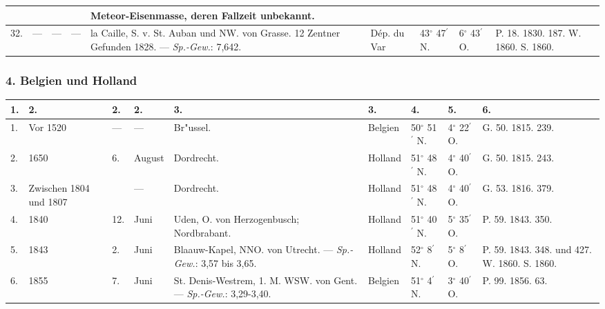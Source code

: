 \documentclass[a4paper, 8pt, oneside, polutonikogreek, german]{article}
\begin{document}
\begin{center}
\begin{longtable}{|p{3mm}|p{10mm}|p{5mm}|p{12mm}|p{25mm}|p{17mm}|p{11mm}|p{11mm}|p{11mm}|}
         & & & & Meteor-Eisenmasse, deren Fallzeit unbekannt. & & & & \\ \hline
        32. & --- & --- & --- & la Caille, S. v. St. Auban und NW. von Grasse. 12 Zentner Gefunden 1828. --- \emph{Sp.-Gew.}: 7,642. & Dép. du Var & 43$^\circ$ 47$^\prime$ N. & 6$^\circ$ 43$^\prime$ O. & P. 18. 1830. 187. W. 1860. S. 1860. \\ \hline
    \end{longtable}
\end{center}
\subsubsection{4. Belgien und Holland}
\begin{table}[H]
    \centering
    \footnotesize
    \begin{longtable}{|p{3mm}|p{10mm}|p{5mm}|p{9mm}|p{25mm}|p{13mm}|p{11mm}|p{11mm}|p{18mm}|}
    \hline
        1. & 2. & 2. & 2. & 3. & 3. & 4. & 5. & 6. \\ \hline
        1. & Vor 1520 & --- & --- & Br"ussel. & Belgien & 50$^\circ$ 51$^\prime$ N. & 4$^\circ$ 22$^\prime$ O. & G. 50. 1815. 239. \\ \hline
        2. & 1650 & 6. & August & Dordrecht. & Holland & 51$^\circ$ 48$^\prime$ N. & 4$^\circ$ 40$^\prime$ O. & G. 50. 1815. 243. \\ \hline
        3. & Zwischen 1804 und 1807 & ~ & --- & Dordrecht. & Holland & 51$^\circ$ 48$^\prime$ N. & 4$^\circ$ 40$^\prime$ O. & G. 53. 1816. 379. \\ \hline
        4. & 1840 & 12. & Juni & Uden, O. von Herzogenbusch; Nordbrabant. & Holland & 51$^\circ$ 40$^\prime$ N. & 5$^\circ$ 35$^\prime$ O. & P. 59. 1843. 350. \\ \hline
        5. & 1843 & 2. & Juni & Blaauw-Kapel, NNO. von Utrecht. --- \emph{Sp.-Gew.}: 3,57 bis 3,65. & Holland & 52$^\circ$ 8$^\prime$ N. & 5$^\circ$ 8$^\prime$ O. & P. 59. 1843. 348. und 427. W. 1860. S. 1860. \\ \hline
        6. & 1855 & 7. & Juni & St. Denis-Westrem, 1. M. WSW. von Gent. --- \emph{Sp.-Gew.}: 3,29-3,40. & Belgien & 51$^\circ$ 4$^\prime$ N. & 3$^\circ$ 40$^\prime$ O. & P. 99. 1856. 63. \\ \hline
    \end{longtable}
\end{table}
\end{document}
